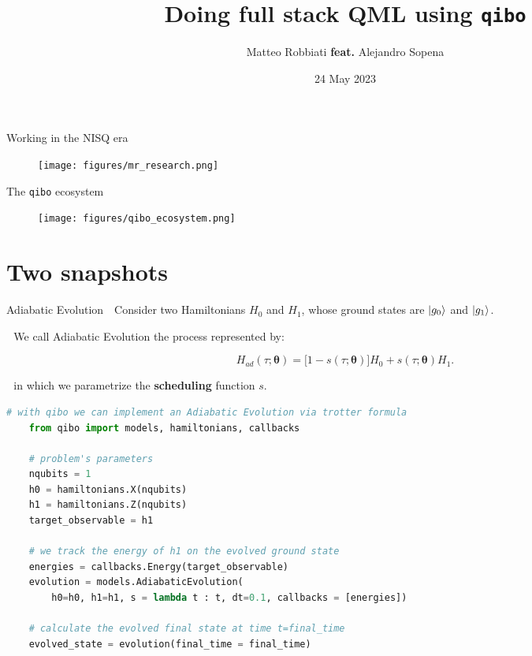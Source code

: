 \documentclass[8pt, xcolor={svgnames}, hyperref={colorlinks, linkcolor=black, citecolor=amethyst, urlcolor=amethyst}]{beamer}
\title{Doing full stack QML using \texttt{qibo}}
\date{24 May 2023}
\author[Matteo Robbiati]{Matteo Robbiati \textbf{\textcolor{amethyst}{feat.}} Alejandro Sopena}
\begin{document}
\maketitle

\begin{frame}{Working in the NISQ era}
    \begin{figure}  
    \texttt{[image: figures/mr\_research.png]}
    \end{figure}
    \vspace{-0.5cm}
\end{frame}

\begin{frame}{The \texttt{qibo} ecosystem}
\small
    \begin{figure}  
    \texttt{[image: figures/qibo\_ecosystem.png]}
    \end{figure}
\end{frame}

\section{Two snapshots}

\begin{frame}[fragile]{Adiabatic Evolution}
\faArrowCircleRight\,\, Consider two Hamiltonians $H_0$ and $H_1$, whose ground
states are $\ket{g_0}$ and $\ket{g_1}$.
\pause

\faArrowCircleRight\,\, We call Adiabatic Evolution the process represented by:
\pause

\begin{equation}
H_{ad}(\tau; \bm{\theta}) = \bigl[ 1 - s(\tau; \bm{\theta}) \bigr] H_0 +
s(\tau; \bm{\theta}) H_1.
\end{equation}
\pause

\faArrowCircleRight\,\, in which we parametrize the \textbf{scheduling} function $s$.
\pause

\begin{tcolorbox}
\begin{lstlisting}[language=Python]
    # with qibo we can implement an Adiabatic Evolution via trotter formula
    from qibo import models, hamiltonians, callbacks

    # problem's parameters
    nqubits = 1
    h0 = hamiltonians.X(nqubits)
    h1 = hamiltonians.Z(nqubits)
    target_observable = h1

    # we track the energy of h1 on the evolved ground state
    energies = callbacks.Energy(target_observable)
    evolution = models.AdiabaticEvolution(
        h0=h0, h1=h1, s = lambda t : t, dt=0.1, callbacks = [energies])

    # calculate the evolved final state at time t=final_time
    evolved_state = evolution(final_time = final_time)
\end{lstlisting}
\end{tcolorbox}

\end{frame}
\end{document}
